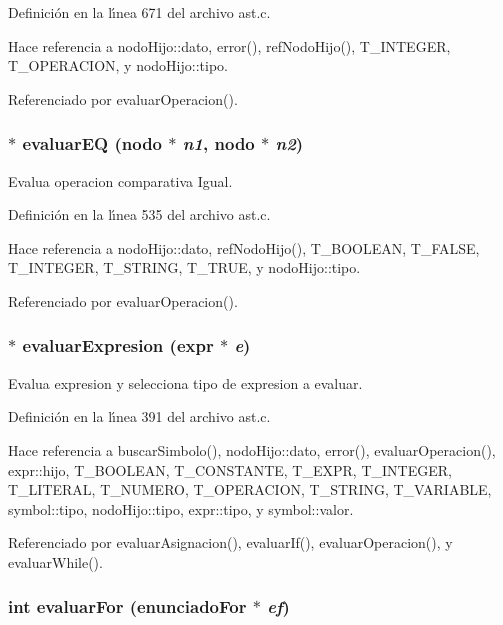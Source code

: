 Definici\'{o}n en la l\'{\i}nea 671 del archivo ast.c.

Hace referencia a nodo\-Hijo::dato, error(), ref\-Nodo\-Hijo(), T\_\-INTEGER, T\_\-OPERACION, y nodo\-Hijo::tipo.

Referenciado por evaluar\-Operacion().
\subsubsection{$\ast$ evaluar\-EQ ({\bf nodo} $\ast$ {\em n1}, {\bf nodo} $\ast$ {\em n2})}\label{ast_8h_a48}


Evalua operacion comparativa Igual. 



Definici\'{o}n en la l\'{\i}nea 535 del archivo ast.c.

Hace referencia a nodo\-Hijo::dato, ref\-Nodo\-Hijo(), T\_\-BOOLEAN, T\_\-FALSE, T\_\-INTEGER, T\_\-STRING, T\_\-TRUE, y nodo\-Hijo::tipo.

Referenciado por evaluar\-Operacion().
\subsubsection{$\ast$ evaluar\-Expresion ({\bf expr} $\ast$ {\em e})}\label{ast_8h_a40}


Evalua expresion y selecciona tipo de expresion a evaluar. 



Definici\'{o}n en la l\'{\i}nea 391 del archivo ast.c.

Hace referencia a buscar\-Simbolo(), nodo\-Hijo::dato, error(), evaluar\-Operacion(), expr::hijo, T\_\-BOOLEAN, T\_\-CONSTANTE, T\_\-EXPR, T\_\-INTEGER, T\_\-LITERAL, T\_\-NUMERO, T\_\-OPERACION, T\_\-STRING, T\_\-VARIABLE, symbol::tipo, nodo\-Hijo::tipo, expr::tipo, y symbol::valor.

Referenciado por evaluar\-Asignacion(), evaluar\-If(), evaluar\-Operacion(), y evaluar\-While().
\subsubsection{\setlength{\rightskip}{0pt plus 5cm}int evaluar\-For ({\bf enunciado\-For} $\ast$ {\em ef})}\label{ast_8h_a56}


